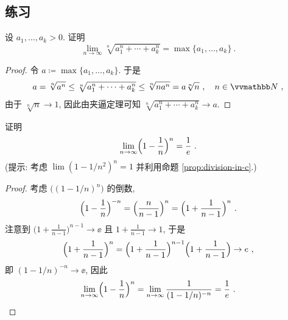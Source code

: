 \subsection{练习}

\begin{exercise}
    设 \(a_1, \ldots, a_k > 0\). 证明
    \[
        \lim_{n \to \infty} \sqrt[n]{a_1^n + \cdots + a_k^n} = \max\{a_1, \ldots, a_k\}\ .
    \]
\end{exercise}

\begin{proof}
    令 \(a \coloneqq \max\{a_1, \ldots, a_k\}\). 于是
    \[
        a = \sqrt[n]{a^n} \leq \sqrt[n]{a_1^n + \cdots + a_k^n} \leq \sqrt[n]{n a^n} = a \sqrt[n]{n}\ ,\quad n \in \N\ ,
    \]
    由于 \(\sqrt[n]{n} \to 1\), 因此由夹逼定理可知 \(\sqrt[n]{a_1^n + \cdots + a_k^n} \to a\).
\end{proof}

\begin{exercise}\label{ex:e-limit-variant-1}
    证明
    \[
        \lim_{n \to \infty} \Bigl(1 - \frac{1}{n}\Bigr)^n = \frac{1}{e}\ .
    \]
    (提示: 考虑 \(\lim (1 - 1 / n^2)^n = 1\) 并利用命题 \ref{prop:division-in-c}.)
\end{exercise}

\begin{proof}
    考虑 \(\bigl((1 - 1 / n)^n\bigr)\) 的倒数,
    \[
        \Bigl(1 - \frac{1}{n}\Bigr)^{- n} = \Bigl(\frac{n}{n - 1}\Bigr)^n = \Bigl(1 + \frac{1}{n - 1}\Bigr)^n\ .
    \]
    注意到 \(\bigl(1 + \frac{1}{n - 1}\bigr)^{n - 1} \to \ee\) 且 \(1 + \frac{1}{n - 1} \to 1\), 于是
    \[
        \Bigl(1 + \frac{1}{n - 1}\Bigr)^n = \Bigl(1 + \frac{1}{n - 1}\Bigr)^{n - 1} \Bigl(1 + \frac{1}{n - 1}\Bigr) \to e\ ,
    \]
    即 \((1 - 1 / n)^{- n} \to \ee\), 因此
    \[
        \lim_{n \to \infty} \Bigl(1 - \frac{1}{n}\Bigr)^n = \lim_{n \to \infty} \frac{1}{(1 - 1 / n)^{- n}} = \frac{1}{e}\ .
    \]
\end{proof}

